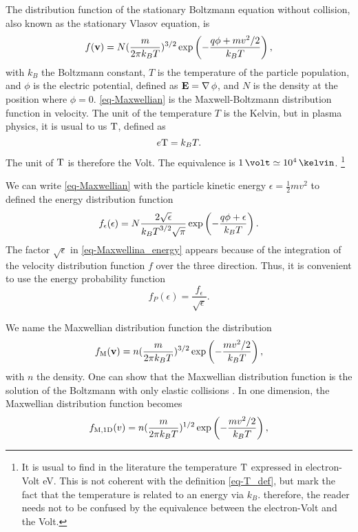 The distribution function of the stationary Boltzmann equation without collision, also known as the stationary Vlasov equation, is
\begin{equation} \label{eq-Maxwellian}
  f({\mathbf v}) = N (\frac{m}{2 \pi k_B T})^{3/2} \exp \left( - \frac{q \phi + m v^2/2}{k_B T } \right),
\end{equation}
with $k_B$ the Boltzmann constant, $T$ is the temperature of the particle population, and $\phi$ is the electric potential, defined as ${\mathbf E} = \operatorname{{\mathbf \nabla}} \phi$, and $N$ is the density at the position where $\phi = 0$.
\cref{eq-Maxwellian} is the Maxwell-Boltzmann distribution function in velocity.
The unit of the temperature $T$ is the Kelvin, but in plasma physics, it is usual to us ${\rm T}$, defined as
\begin{equation} \label{eq-T_def}
  e {\rm T} = k_B T.
\end{equation}
The unit of ${\rm T}$ is therefore the Volt.
The equivalence is $1 \,\volt \simeq 10^4 \,\kelvin$.
\footnote{It is usual to find in the literature the temperature ${\rm T}$ expressed in electron-Volt eV.
This is not coherent with the definition \cref{eq-T_def}, but mark the fact that the temperature is related to an energy via $k_B$. therefore, the reader needs not to be confused by the equivalence between the electron-Volt and the Volt.  }

We can write \cref{eq-Maxwellian} with the particle kinetic energy $\epsilon = \frac{1}{2} m v^2$ to defined the energy distribution function
\begin{equation} \label{eq-Maxwellina_energy}
  f_{\epsilon}(\epsilon) = N \frac{2 \sqrt{\epsilon}}{{k_B T}^{3/2} \sqrt{\pi}} \exp \left(- \frac{q \phi + \epsilon}{k_B T} \right).
\end{equation}
The factor $\sqrt{\epsilon}$ in \cref{eq-Maxwellina_energy} appears because of the integration of the velocity distribution function $f$ over the three direction.
Thus, it is convenient to use the energy probability function 
\begin{equation} \label{eq-EPF}
  f_P(\epsilon) = \frac{f_{\epsilon}}{\sqrt{\epsilon}}.
\end{equation}

We name the Maxwellian distribution function the distribution
\begin{equation} \label{eq-Maxwelliantwo}
  f_{\rm M}({\mathbf v}) = n (\frac{m}{2 \pi k_B T})^{3/2} \exp \left( - \frac{ m v^2/2}{k_B T } \right),
\end{equation}
with $n$ the density.
One can show that the Maxwellian distribution function is the solution of the Boltzmann with only elastic collisions \citet{lieberman2005}.
In one dimension, the Maxwellian distribution function becomes
\begin{equation}
  f_{\rm M, 1D}(v) =  n (\frac{m}{2 \pi k_B T})^{1/2} \exp \left( - \frac{ m v^2/2}{k_B T } \right),
\end{equation}

